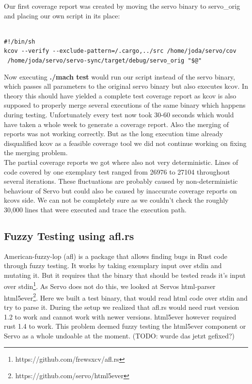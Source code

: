 \documentclass{scrartcl}
\newcommand{\todo}[1] {{\color{red}(TODO: #1)}}
\begin{document}
Our first coverage report was created by moving the servo binary to servo\_orig and placing our own script in its place:

\begin{verbatim}

#!/bin/sh
kcov --verify --exclude-pattern=/.cargo,../src /home/joda/servo/cov 
 /home/joda/servo/servo-sync/target/debug/servo_orig "$@"

\end{verbatim}

Now executing \textbf{./mach test} would run our script instead of the servo binary, which passes all parameters to the original servo binary but also executes kcov. In theory this should have yielded a complete test coverage report as kcov is also supposed to properly merge several executions of the same binary which happens during testing. Unfortunately every test now took 30-60 seconds which would have taken a whole week to generate a coverage report. Also the merging of reports was not working correctly. But as the long execution time already disqualified kcov as a feasible coverage tool we did not continue working on fixing the merging problem.\\

The partial coverage reports we got where also not very deterministic. Lines of code covered by one exemplary test ranged from 26976 to 27104 throughout several iterations. These fluctuations are probably caused by non-deterministic behaviour of Servo but could also be caused by inaccurate coverage reports on kcovs side. We can not be completely sure as we couldn't check the roughly 30,000 lines that were executed and trace the execution path.

\subsection{Fuzzy Testing using afl.rs}
American-fuzzy-lop (afl) is a package that allows finding bugs in Rust code through fuzzy testing. It works by taking exemplary input over stdin and mutating it. But it requires that the binary that should be tested reads it's input over stdin\footnote{https://github.com/frewsxcv/afl.rs}. As Servo does not do this, we looked at Servos html-parser html5ever\footnote{https://github.com/servo/html5ever}. Here we built a test binary, that would read html code over stdin and try to parse it. During the setup we realized that afl.rs would need rust version 1.2 to work and cannot work with newer versions. html5ever however required rust 1.4 to work. This problem deemed fuzzy testing the html5ever component or Servo as a whole undoable at the moment. \todo{wurde das jetzt gefixed?}
\end{document}
